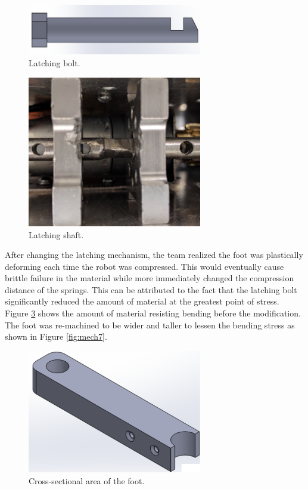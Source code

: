 \documentclass[ece]{uw-wkrpt}
\begin{document}
\begin{figure}
    \centering
    \includegraphics[width=3.0in]{res/mech4}
    \caption[Latching bolt]
          {Latching bolt.}
    \label{fig:mech4}
\end{figure}

\begin{figure}
    \centering
    \includegraphics[width=3.0in]{res/mech5}
    \caption[Latching shaft]
          {Latching shaft.}
    \label{fig:mech5}
\end{figure}

After changing the latching mechanism, the team realized the foot was plastically deforming each time the robot was compressed. This would eventually cause brittle failure in the material while more immediately changed the compression distance of the springs. This can be attributed to the fact that the latching bolt significantly reduced the amount of material at the greatest point of stress. Figure \ref{fig:mech6} shows the amount of material resisting bending before the modification. The foot was re-machined to be wider and taller to lessen the bending stress as shown in Figure \ref{fig:mech7}.

\begin{figure}
    \centering
    \includegraphics[width=3.0in]{res/mech6}
    \caption[Cross section of the Foot]
          {Cross-sectional area of the foot.}
    \label{fig:mech6}
\end{figure}
\end{document}
